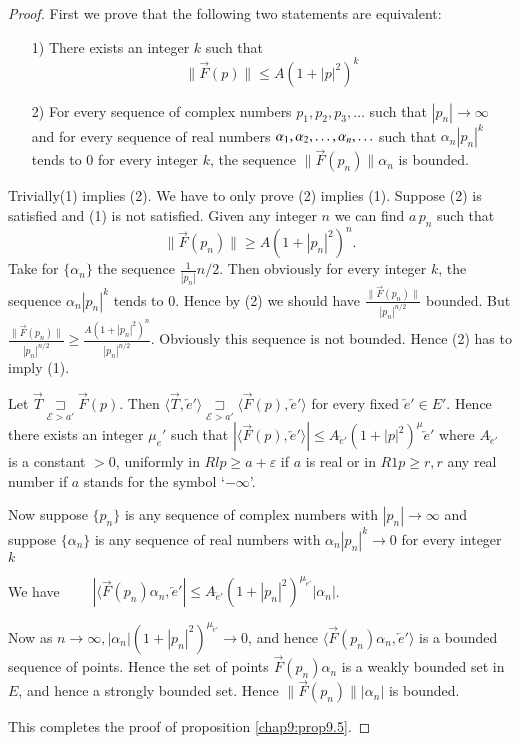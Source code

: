 \begin{proof}
First we prove that the following two statements are equivalent:

\begin{itemize}
\item [1)] There exists an integer $k$ such that 
$$
\parallel \overrightarrow{F} (p)\parallel \leq A (1+|p|^2)^k
$$
\item [2)] For every sequence of complex numbers $p_1, p_2,
  p_3,\ldots$ such that $|p_n| \to \infty$ and for every sequence of
  real numbers $\alpha_1, \alpha_2, \ldots,\break\alpha_n, \ldots$ such
  that $\alpha_n |p_n|^k$ tends to $0$ for every integer $k$, the
  sequence $\parallel \overrightarrow{F}(p_n)\parallel \alpha_n$ is bounded.
\end{itemize}
Trivially\pageoriginale (1) implies (2). We have to only prove (2)
implies (1). Suppose (2) is satisfied and (1) is not satisfied. Given
any integer $n$ we can find $a\,p_n$ such that 
$$
\parallel \overrightarrow{F} (p_n)\parallel \geq A (1 + |p_n|^2)^n.
$$
Take for $\{\alpha_n\}$ the sequence $\frac{1}{|p_n|}n/2$. Then
obviously for every integer $k$, the sequence $\alpha_n|p_n|^k$ tends
to $0$. Hence by (2) we should have $\frac{\parallel
  \overrightarrow{F}(p_n)\parallel}{|p_n|^{n/2}}$ bounded. But
$\frac{\parallel \overrightarrow{F} (p_n)\parallel}{|p_n|^{n/2}} \geq
\frac{A(1+|p_n|^2)^n}{|p_n|^{n/2}}$. Obviously this sequence is not
bounded. Hence (2) has to imply (1).

Let $\overrightarrow{T} \underset{\mathscr{E} > a'}{\sqsupset}
\overrightarrow{F} (p)$. Then $\langle \overrightarrow{T},
\overleftarrow{e}'\rangle \underset{\mathscr{E}> a'}{\sqsupset}
\langle \overrightarrow{F} (p), \overleftarrow{e}'\rangle$ for every
fixed $\overleftarrow{e}' \in E'$. Hence there exists an integer
$\mu_e'$ such that $|\langle \overrightarrow{F} (p),
\overleftarrow{e}'\rangle | \leq A_{\overleftarrow{e}'} (1+|p|^2)^\mu
\overleftarrow{e}'$ where $A_{\overleftarrow{e}'}$ is a constant $>0$,
uniformly in $Rl p \geq a + \varepsilon$ if $a$ is real or in $R1 p
\geq r, r$ any real number if $a$ stands for the symbol `$-\infty$'.

Now suppose $\{p_n\}$ is any sequence of complex numbers with $|p_n|
\to \infty$ and suppose $\{\alpha_n\}$ is any sequence of real numbers
with $\alpha_n|p_n|^k\to 0$ for every integer $k$

\noindent 
We have $\qquad |\langle \overrightarrow{F}(p_n)
\alpha_n,\overleftarrow{e}'| \leq{A_{\overleftarrow{e}'}
(1+|p_n|^2)}^{\mu_{\overleftarrow{e}'}} |\alpha_n|$.

\noindent 
Now as $n \to \infty, |\alpha_n|
 {(1+|p_n|^2)}^{\mu_{\overleftarrow{e}'}} \to 0$, and hence
 $\langle \overrightarrow{F} (p_n)\alpha_n,
 \overleftarrow{e}'\rangle$ is a bounded sequence of points. Hence the
 set of points $\overrightarrow{F} (p_n)\alpha_n$ is a weakly bounded
 set in $E$, and hence a strongly bounded set. Hence $\parallel
 \overrightarrow{F} (p_n)\parallel |\alpha_n|$ is bounded.

This completes the proof of proposition \ref{chap9:prop9.5}.    
\end{proof}
